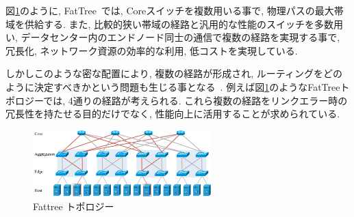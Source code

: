 \documentclass[11pt, a4paper, twocolumn]{jsarticle}
\begin{document}
図\ref{fig:fattree}のように, FatTree~\cite{fattree}では, Coreスイッチを複数用いる事で,
物理パスの最大帯域を供給する.
また, 比較的狭い帯域の経路と汎用的な性能のスイッチを多数用い, データセンター内のエンドノード同士の通信で複数の経路を実現する事で, 冗長化,
ネットワーク資源の効率的な利用, 低コストを実現している.

しかしこのような密な配置により, 複数の経路が形成され, ルーティングをどのように決定すべきかという問題も生じる事となる~\cite{improving}.
例えば図\ref{fig:fattree}のようなFatTreeトポロジーでは, 4通りの経路が考えられる.
これら複数の経路をリンクエラー時の冗長性を持たせる目的だけでなく, 性能向上に活用することが求められている.
\begin{figure}[h]
    \begin{center}
    \includegraphics[autoebb, width=195pt]{./img/fattree_topology.pdf}
    \caption{Fattree トポロジー}
    \label{fig:fattree}
    \end{center}
\end{figure}

\end{document}
